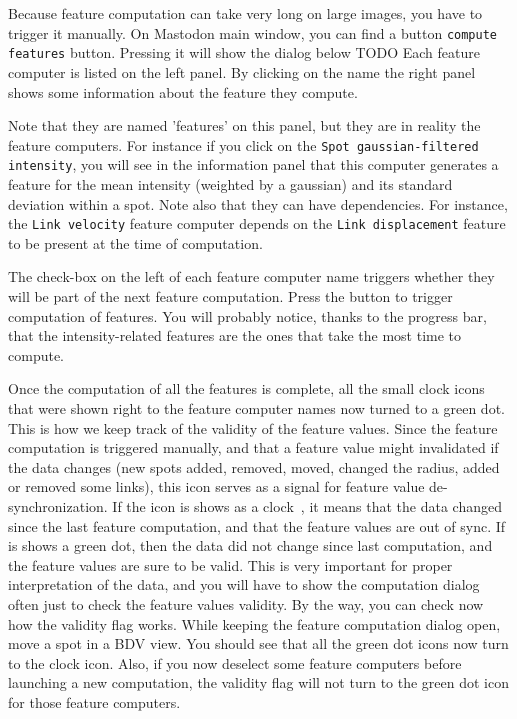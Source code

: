 Because feature computation can take very long on large images, you have to trigger it manually.
On Mastodon main window, you can find a button \texttt{compute features} button.
Pressing it will show the dialog below
TODO
Each feature computer is listed on the left panel.
By clicking on the name the right panel shows some information about the feature they compute. 

Note that they are named 'features' on this panel, but they are in reality the feature computers.
For instance if you click on the \texttt{Spot gaussian-filtered intensity}, you will see in the information panel that this computer generates a feature for the mean intensity (weighted by a gaussian) and its standard deviation within a spot.
Note also that they can have dependencies.
For instance, the \texttt{Link velocity} feature computer depends on the \texttt{Link displacement} feature to be present at the time of computation.

The check-box on the left of each feature computer name triggers whether they will be part of the next feature computation.
Press the  button to trigger computation of features.
You will probably notice, thanks to the progress bar, that the intensity-related features are the ones that take the most time to compute. 

Once the computation of all the features is complete, all the small clock icons that were shown right to the feature computer names now turned to a green dot.
This is how we keep track of the validity of the feature values.
Since the feature computation is triggered manually, and that a feature value might invalidated if the data changes (new spots added, removed, moved, changed the radius, added or removed some links), this icon serves as a signal for feature value de-synchronization.     
If the icon is shows as a clock~, it means that the data changed since the last feature computation, and that the feature values are out of sync. 
If is shows a green dot, then the data did not change since last computation, and the feature values are sure to be valid. 
This is very important for proper interpretation of the data, and you will have to show the computation dialog often just to check the feature values validity. 
By the way, you can check now how the validity flag works. 
While keeping the feature computation dialog open, move a spot in a BDV view. 
You should see that all the green dot icons now turn to the clock icon.
Also, if you now deselect some feature computers before launching a new computation, the validity flag will not turn to the green dot icon for those feature computers.








